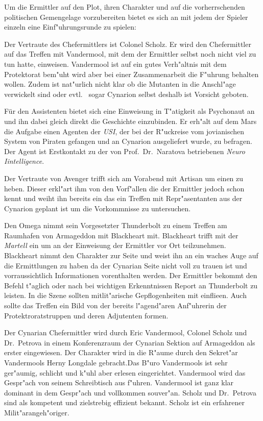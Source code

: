 

Um die Ermittler auf den Plot, ihren Charakter und auf die vorherrschenden politischen Gemengelage vorzubereiten bietet es sich an mit jedem der Spieler einzeln eine Einf"uhrungsrunde zu spielen:

Der Vertraute des Chefermittlers ist Colonel Scholz. Er wird den Chefermittler auf das Treffen mit Vandermool, mit dem der Ermittler selbst noch nicht viel zu tun hatte, einweisen. Vandermool ist auf ein gutes Verh"altnis mit dem Protektorat bem"uht wird aber bei einer Zusammenarbeit die F"uhrung behalten wollen. Zudem ist nat"urlich nicht klar ob die Mutanten in die Anschl"age verwickelt sind oder evtl. ~sogar Cynarion selbst deshalb ist Vorsicht geboten.

Für den Assistenten bietet sich eine Einweisung in T"atigkeit als Psychonaut an und ihn dabei gleich direkt die Geschichte einzubinden. Er erh"alt auf dem Mars die Aufgabe einen Agenten der \emph{USI}, der bei der R"uckreise vom jovianischen System von Piraten gefangen und an Cynarion ausgeliefert wurde, zu befragen. Der Agent ist Erstkontakt zu der von Prof.~Dr.~Naratova betriebenen \emph{Neuro Iintelligence}.

Der Vertraute von Avenger trifft sich am Vorabend mit Artisan um einen zu heben. Dieser erkl"art ihm von den Vorf"allen die der Ermittler jedoch schon kennt und weiht ihn bereits ein das ein Treffen mit Repr"asentanten aus der Cynarion geplant ist um die Vorkommnisse zu untersuchen.

Den Omega nimmt sein Vorgesetzter Thunderbolt zu einem Treffen am Raumhafen von Armageddon mit Blackheart mit. Blackheart trifft mit der \emph{Martell} ein um an der Einweisung der Ermittler vor Ort teilzunehmen. Blackheart nimmt den Charakter zur Seite und weist ihn an ein waches Auge auf die Ermittlungen zu haben da der Cynarian Seite nicht voll zu trauen ist und vorraussichtlich Informationen vorenthalten werden.
Der Ermittler bekommt den Befehl t"aglich oder nach bei wichtigen Erkenntnissen Report an Thunderbolt zu leisten. In die Szene sollten mitlit"arische Gepflogenheiten mit einflie\3en. Auch sollte das Treffen ein Bild von der bereits l"agend"aren Anf"uhrerin der Protektroratstruppen und deren Adjutenten formen.


Der Cynarian Chefermittler wird durch Eric Vandermool, Colonel Scholz und Dr.~Petrova in einem Konferenzraum der Cynarian Sektion auf Armageddon als erster eingewiesen. Der Charakter wird in die R"aume durch den Sekret"ar Vandermools Herny Longdale gebracht.Das B"uro Vandermools ist sehr ger"aumig, schlicht und k"uhl aber erlesen eingerichtet. Vandermool wird das Gespr"ach von seinem Schreibtisch aus f"uhren. Vandermool ist ganz klar dominant in dem Gespr"ach und vollkommen souver"an. Scholz und Dr.~Petrova sind als kompetent und zielstrebig effizient bekannt. Scholz ist ein erfahrener Milit"arangeh"origer.

